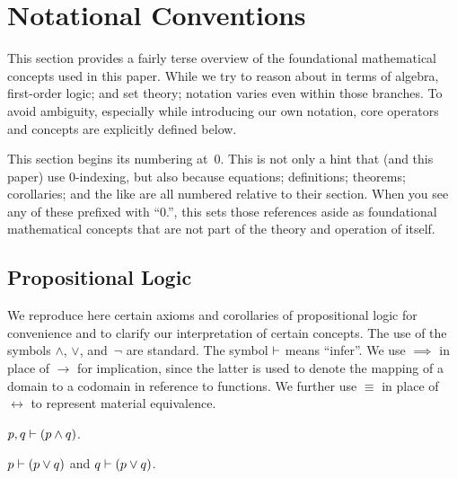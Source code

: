 %
%

\section{Notational Conventions}
This section provides a fairly terse overview of the foundational
  mathematical concepts used in this paper.
While we try to reason about \tame{} in terms of algebra,
  first-order logic;
  and set theory;
    notation varies even within those branches.
To avoid ambiguity,
  especially while introducing our own notation,
  core operators and concepts are explicitly defined below.

This section begins its numbering at~0.
This is not only a hint that \tame{} (and this paper) use 0-indexing,
  but also because equations; definitions; theorems; corollaries; and the
  like are all numbered relative to their section.
When you see any of these prefixed with ``0.'',
  this sets those references aside as foundational mathematical concepts
    that are not part of the theory and operation of \tame{} itself.


\subsection{Propositional Logic}
We reproduce here certain axioms and corollaries of propositional logic for
  convenience and to clarify our interpretation of certain concepts.
The use of the symbols $\land$, $\lor$, and~$\neg$ are standard.
\indexsym{}
The symbol $\vdash$ means ``infer''.
We use $\implies$ in place of $\rightarrow$ for implication,
  since the latter is used to denote the mapping of a domain to a codomain
  in reference to functions.
We further use $\equiv$ in place of $\leftrightarrow$ to represent material
  equivalence.

\indexsym{}
\begin{definition}
  $p,q \vdash (p\land q)$.
\end{definition}

\indexsym{}
\begin{definition}
  $p \vdash (p\lor q)$ and $q \vdash (p\lor q)$.
\end{definition}


